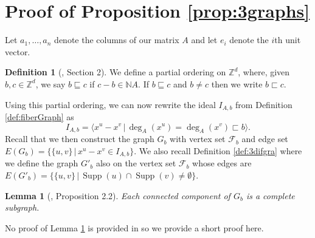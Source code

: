 \documentclass[a4paper, 12pt]{article}
\newcommand{\NN}{\mathbb N}
\newcommand{\ZZ}{\mathbb Z}
\theoremstyle{plain}
\newtheorem{lemma}[theorem]{Lemma}
\theoremstyle{definition}
\newtheorem{definition}[theorem]{Definition}
\theoremstyle{remark}
\begin{document}








\appendix

\section{Proof of Proposition \ref{prop:3graphs}}

Let $a_1,\dots ,a_n$ denote the columns of our matrix $A$ and let $e_i$ denote the $i$th unit vector.%


\begin{definition}[\cite{CKT_2007}, Section 2] \label{def:partord}
    We define a partial ordering on $\mathbb{Z}^d$, where, given $b,c \in \mathbb{Z}^d$, we say $b \sqsubseteq c$ if $c-b \in \NN A$. If $b \sqsubseteq c$ and $b \neq c$ then we write $b \sqsubset c$.
\end{definition}

Using this partial ordering, we can now rewrite the ideal $I_{A,b}$ from Definition \ref{def:fiberGraph} as 
$$I_{A,b} = \langle x^u-x^v \,|\,  \deg_A(x^u)=\deg_A(x^v) \sqsubset b \rangle.$$
Recall that we then construct the graph $G_b$ with vertex set $\mathcal F_b$ and edge set 
$E(G_b) = \{\{u,v\} \,|\, x^u-x^v \in I_{A,b}\}$.
We also recall Definition \ref{def:3difgra} where we define the graph $G'_b$ also on the vertex set $\mathcal{F}_b$ whose edges are $E(G'_b)=\{\{u,v\} \,|\, \operatorname{Supp}(u) \cap \operatorname{Supp}(v) \neq \emptyset\}$.


\begin{lemma}[\cite{CKT_2007}, Proposition 2.2] \label{lem:CKTprop2.2}
     Each connected component of $G_b$ is a complete subgraph.
\end{lemma}

No proof of Lemma \ref{lem:CKTprop2.2} is provided in \cite{CKT_2007} so we provide a short proof here.
\end{document}
